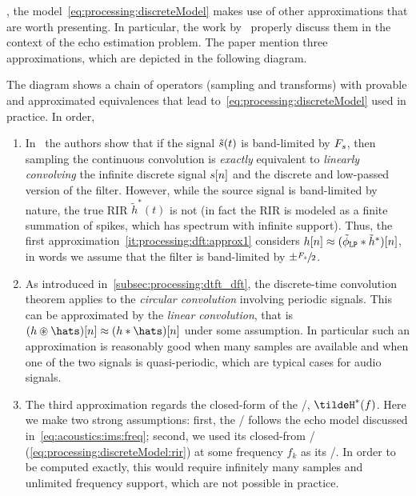 , the model~\eqref{eq:processing:discreteModel} makes use of other approximations that are worth presenting.
In particular, the work by~ properly discuss them in the context of the echo estimation problem.
The paper mention three approximations, which are depicted in the following diagram.
\begin{figure}[!h]
    \begin{fullwidth}
    \centering
    
    \end{fullwidth}
\end{figure}
The diagram shows a chain of operators (sampling and transforms) with provable and approximated equivalences that lead to~\cref{eq:processing:discreteModel} used in practice.
In order,
\begin{enumerate}[label=(\roman*)]
    \item\label{it:processing:dft:approx1}
    In~ the authors show that if the signal $\tilde{s}(t)$ is band-limited by $F_s$,
    then sampling the continuous convolution is \textit{exactly} equivalent to \textit{linearly convolving} the infinite discrete signal ${s}[n]$ and the discrete and low-passed version of the filter.
    However, while the source signal is band-limited by nature, the true \ac{RIR} $\tilde{h}^*(t)$ is not (in fact the \ac{RIR} is modeled as a finite summation of spikes, which has spectrum with infinite support).
    Thus, the first approximation~\ref{it:processing:dft:approx1} considers ${h}[n] \approx (\lowpassfilter \convDis \tilde{h}^*)[n]$, in words we assume that the filter is band-limited by $\pm \sfrac{F_s}{2}$.

    \item\label{it:processing:dft:approx2}
    As introduced in~\cref{subsec:processing:dtft_dft}, the discrete-time convolution theorem applies to the \textit{circular convolution} involving periodic signals.
    This can be approximated by the \textit{linear convolution}, that is $(h \circledast \hats)[n] \approx (h \convDis \hats)[n]$ under some assumption.
    In particular such an approximation is reasonably good when many samples are available and when one of the two signals is quasi-periodic, which are typical cases for audio signals.

    \item\label{it:processing:dft:approx3}
    The third approximation regards the closed-form of the \RTF/, $\tildeH^*(f)$.
    Here we make two strong assumptions:
    first, the \RTF/ follows the echo model discussed in~\cref{eq:acoustics:ims:freq};
    second, we used its closed-from \DTFT/ (\cref{eq:processing:discreteModel:rir}) at some frequency $f_k$ as its \DFT/.
    In order to be computed exactly, this would require infinitely many samples and unlimited frequency support, which are not possible in practice.
\end{enumerate}

